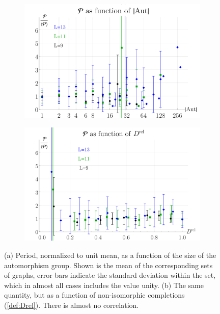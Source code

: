 \documentclass[11pt,a4paper]{article}
\renewcommand{\|}{\rule[-0.4ex]{0.2ex}{1.2em}}
\begin{document}
\begin{figure}[htbp]
	\begin{subfigure}[b]{.49 \textwidth}
		\includegraphics[width=\linewidth]{P_Aut}
		\subcaption{}
		\label{fig:P_Aut}
	\end{subfigure}
	\begin{subfigure}[b]{.48 \textwidth}
	\includegraphics[width=\linewidth]{P_Drel}
	\subcaption{}
	\label{fig:P_Drel}
\end{subfigure}
	
	\caption{(a) Period, normalized to unit mean, as a function of the size of the automorphism group.  Shown is the mean of the corresponding sets of graphs, error bars indicate the standard deviation within the set, which in almost all cases  includes the value unity. (b) The same quantity, but as a function of non-isomorphic completions (\cref{def:Drel}). There is almost no correlation. }
	
\end{figure}
\end{document}
